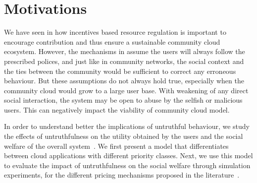 
\section{Motivations}
\label{sec__truthful_pricing_introduction}

We have seen in  how incentives based resource regulation is important to
encourage contribution and thus ensure a sustainable community cloud ecosystem.
However, the mechanisms in  assume the users will always follow the prescribed polices,
and just like in community networks, the social context and the ties between the community
would be sufficient to correct any erroneous behaviour.
But these assumptions do not always hold true, especially when the community cloud would grow  to a large user base.
With weakening of any direct social interaction, the system may be open to abuse by the selfish or malicious users.
This can negatively impact the viability of community cloud model.


In order to understand better the implications of untruthful behaviour, 
we study the effects of untruthfulness on the utility obtained by the users and the social welfare of the overall system~\cite{Khan2015Towards}.
We first present a model that differentiates between cloud applications with different priority classes.
Next, we use this model to evaluate the impact of untruthfulness on the social welfare
through simulation experiments, 
for the different pricing mechanisms proposed in the literature~\cite{Maille2014}.
